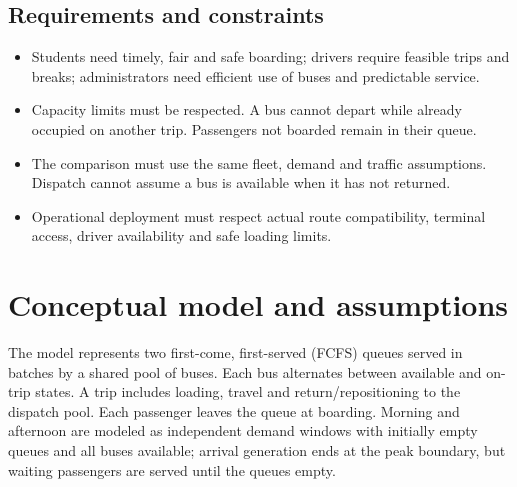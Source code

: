 \documentclass[conference]{IEEEtran}
\begin{document}
\subsection{Requirements and constraints}
\begin{itemize}
\item Students need timely, fair and safe boarding; drivers require feasible trips and breaks; administrators need efficient use of buses and predictable service.
\item Capacity limits must be respected. A bus cannot depart while already occupied on another trip. Passengers not boarded remain in their queue.
\item The comparison must use the same fleet, demand and traffic assumptions. Dispatch cannot assume a bus is available when it has not returned.
\item Operational deployment must respect actual route compatibility, terminal access, driver availability and safe loading limits.
\end{itemize}
\section{Conceptual model and assumptions}
The model represents two first-come, first-served (FCFS) queues served in batches by a shared pool of buses. Each bus alternates between available and on-trip states. A trip includes loading, travel and return/repositioning to the dispatch pool. Each passenger leaves the queue at boarding. Morning and afternoon are modeled as independent demand windows with initially empty queues and all buses available; arrival generation ends at the peak boundary, but waiting passengers are served until the queues empty.
\end{document}
